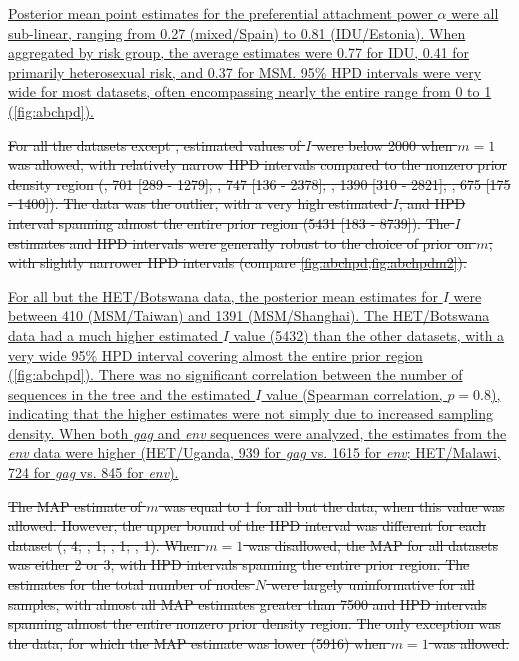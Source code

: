 \documentclass[12pt]{article}\usepackage[]{graphicx}\usepackage[]{color}
\let\mref\cref
\let\mciteauthor\citeauthor
\renewcommand{\cref}[1]{\mbox{\mref{#1}}}
\renewcommand{\citeauthor}[1]{\mbox{\mciteauthor{#1}}}
\newcommand{\add}[1]{\color{blue} \uline{#1} \color{black}}
\newcommand{\del}[1]{\color{red} \sout{#1} \color{black}}
\begin{document}
\add{Posterior mean point estimates for the preferential attachment power $\alpha$
were all sub-linear, ranging from 
    0.27
(mixed/Spain) to
    0.81
(IDU/Estonia). When aggregated by risk group, the average estimates were
    0.77
for IDU,
    0.41
for primarily heterosexual risk, and
    0.37
for MSM. 95\% HPD intervals were very wide for most datasets, often
encompassing nearly the entire range from 0 to 1 (\cref{fig:abchpd}).}

\del{For all the datasets except \citeauthor{novitsky2014impact}, estimated values
of $I$ were below 2000 when $m = 1$ was allowed, with relatively narrow HPD
intervals compared to the nonzero prior density region
  (\citeauthor{cuevas2009hiv}, 701 
  [289 -
   1279];
   \citeauthor{niculescu2015recent}, 747
  [136 - 
   2378];
  \citeauthor{li2015hiv}, 1390 
  [310 -
   2821];
   \citeauthor{wang2015targeting}, 675
  [175 - 
   1400]).
The \citeauthor{novitsky2014impact} data was the outlier, with a very high
estimated $I$, and HPD interval spanning almost the entire prior region
  (5431 
  [183 -
   8739]).
The $I$ estimates and HPD intervals were generally robust to the choice of
prior on $m$, with slightly narrower HPD intervals (compare
\cref{fig:abchpd,fig:abchpdm2}).}



\add{For all but the HET/Botswana data, the posterior mean estimates for
$I$ were between
    410
(MSM/Taiwan) and
    1391
(MSM/Shanghai). The HET/Botswana data had a much higher estimated $I$ value
    (5432)
than the other datasets, with a very wide 95\% HPD interval covering almost the
entire prior region (\cref{fig:abchpd}). There was no significant correlation
between the number of sequences in the tree and the estimated $I$ value
(Spearman correlation, 
    $p =0.8$),
indicating that the higher estimates were not simply due to increased sampling
density. When both \textit{gag} and \textit{env} sequences were analyzed, the
estimates from the \textit{env} data were higher (HET/Uganda,
    939 for \textit{gag} vs.
    1615 for \textit{env};
HET/Malawi,
    724 for \textit{gag} vs.
    845 for \textit{env}).}

\del{The MAP estimate of $m$ was equal to 1 for all but the
\citeauthor{novitsky2014impact} data, when this value was allowed. However, the
upper bound of the HPD interval was different for each dataset
  (\citeauthor{niculescu2015recent}, 4;
   \citeauthor{wang2015targeting}, 1;
   \citeauthor{li2015hiv}, 1;
   \citeauthor{cuevas2009hiv}, 1).
When $m = 1$ was disallowed, the MAP for all datasets was either 2 or 3, with
HPD intervals spanning the entire prior region. The estimates for the total
number of nodes $N$ were largely uninformative for all samples, with almost all
MAP estimates greater than 7500 and HPD intervals spanning almost the entire
nonzero prior density region. The only exception was the \citeauthor{li2015hiv}
data, for which the MAP estimate was lower 
  (5916)
when $m = 1$ was allowed.}
\end{document}
